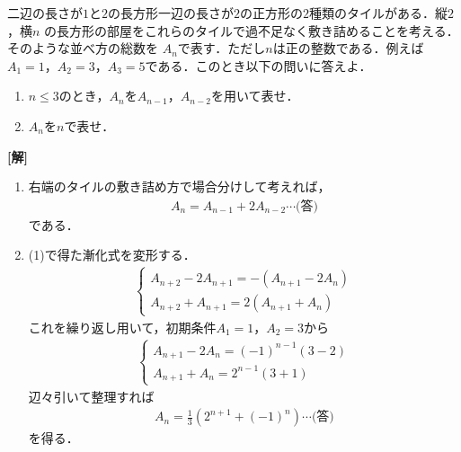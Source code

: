 \documentclass[a4j]{jarticle}
\begin{document}

\begin{oframed}
二辺の長さが$1$と$2$の長方形一辺の長さが$2$の正方形の$2$種類のタイルがある．縦$2$，横$n$
の長方形の部屋をこれらのタイルで過不足なく敷き詰めることを考える．そのような並べ方の総数を
$A_n$で表す．ただし$n$は正の整数である．例えば$A_1=1$，$A_2=3$，$A_3=5$である．このとき以下の問いに答えよ．
     \begin{enumerate}[(1)]
     \item $n\le3$のとき，$A_n$を$A_{n-1}$，$A_{n-2}$を用いて表せ．
     \item $A_n$を$n$で表せ．
     \end{enumerate}
\end{oframed}

\setlength{\columnseprule}{0.4pt}
\begin{multicols}{2}
{\bf[解]}
     \begin{enumerate}[(1)]
     \item 右端のタイルの敷き詰め方で場合分けして考えれば，
          \begin{align*}
          A_n=A_{n-1}+2A_{n-2}\cdots\text{(答)}
          \end{align*}
     である．
     
     \item (1)で得た漸化式を変形する．
           \begin{align*}
           \left\{
                \begin{array}{l}
               A_{n+2}-2A_{n+1}=-(A_{n+1}-2A_{n}) \\
               A_{n+2}+A_{n+1}=2( A_{n+1}+A_{n})
               \end{array}
         \right.      
         \end{align*}
    これを繰り返し用いて，初期条件$A_1=1$，$A_2=3$から
               \begin{align*}
               \left\{
                    \begin{array}{l}
                    A_{n+1}-2A_{n}=(-1)^{n-1}(3-2) \\
                    A_{n+1}+A_{n}=2^{n-1}(3+1)
                    \end{array}
              \right.
              \end{align*}
     辺々引いて整理すれば
          \begin{align*}
          A_n=\frac{1}{3}\left(2^{n+1}+(-1)^n\right)\cdots\text{(答)}
          \end{align*}
     を得る．    
     \end{enumerate}
\newpage
\end{multicols}
\end{document}
